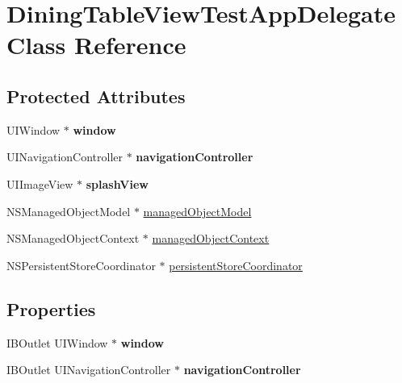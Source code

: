 \hypertarget{interface_dining_table_view_test_app_delegate}{
\section{DiningTableViewTestAppDelegate Class Reference}
\label{interface_dining_table_view_test_app_delegate}
}
\subsection*{Protected Attributes}
\begin{DoxyCompactItemize}
\item 
\hypertarget{interface_dining_table_view_test_app_delegate_abc4f20e65f5bc6ab34966db913c93219}{
UIWindow $\ast$ {\bfseries window}}
\label{interface_dining_table_view_test_app_delegate_abc4f20e65f5bc6ab34966db913c93219}

\item 
\hypertarget{interface_dining_table_view_test_app_delegate_a96bc01c29237c2d00e49ee82a9f98056}{
UINavigationController $\ast$ {\bfseries navigationController}}
\label{interface_dining_table_view_test_app_delegate_a96bc01c29237c2d00e49ee82a9f98056}

\item 
\hypertarget{interface_dining_table_view_test_app_delegate_a81358459e2e97946caf43f64a4386bde}{
UIImageView $\ast$ {\bfseries splashView}}
\label{interface_dining_table_view_test_app_delegate_a81358459e2e97946caf43f64a4386bde}

\item 
NSManagedObjectModel $\ast$ \hyperlink{interface_dining_table_view_test_app_delegate_af07ec7ac706012aded6a2ac49aba70f3}{managedObjectModel}
\item 
NSManagedObjectContext $\ast$ \hyperlink{interface_dining_table_view_test_app_delegate_ae0ffa5eb42dd103b6708377045afc6df}{managedObjectContext}
\item 
NSPersistentStoreCoordinator $\ast$ \hyperlink{interface_dining_table_view_test_app_delegate_a78473b03e27135c4bf6312909230821d}{persistentStoreCoordinator}
\end{DoxyCompactItemize}
\subsection*{Properties}
\begin{DoxyCompactItemize}
\item 
\hypertarget{interface_dining_table_view_test_app_delegate_a257a7920def52cd0c571b73655f2391d}{
IBOutlet UIWindow $\ast$ {\bfseries window}}
\label{interface_dining_table_view_test_app_delegate_a257a7920def52cd0c571b73655f2391d}

\item 
\hypertarget{interface_dining_table_view_test_app_delegate_a1d5d4231fd2de82cedbc922a3e8ffef5}{
IBOutlet UINavigationController $\ast$ {\bfseries navigationController}}
\label{interface_dining_table_view_test_app_delegate_a1d5d4231fd2de82cedbc922a3e8ffef5}

\end{DoxyCompactItemize}


